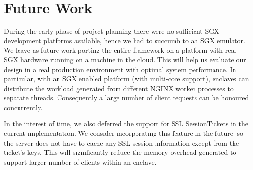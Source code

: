 \documentclass[../main.tex]{subfiles}
\begin{document}
\section{Future Work}
During the early phase of project planning there were no sufficient SGX
development platforms available, hence we had to succumb to an SGX emulator. We
leave as future work porting the entire framework on a platform with real SGX
hardware running on a machine in the cloud. This will help us evaluate our
design in a real production environment with optimal system performance. In
particular, with an SGX enabled platform (with multi-core support), enclaves
can distribute the workload generated from different NGINX worker processes to
separate threads. Consequently a large number of client requests can be
honoured concurrently.

In the interest of time, we also deferred the support for SSL SessionTickets in
the current implementation. We consider incorporating this feature in the
future, so the server does not have to cache any SSL session information except
from the ticket's keys. This will significantly reduce the memory overhead
generated to support larger number of clients within an enclave.
\end{document}
